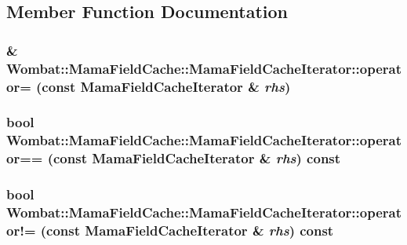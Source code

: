 \subsection{Member Function Documentation}
\hypertarget{classWombat_1_1MamaFieldCache_1_1MamaFieldCacheIterator_adf1ab9b28b21e86297a0e201803f4d89}{
\subsubsection[{operator=}]{\& Wombat::MamaFieldCache::MamaFieldCacheIterator::operator= (const {\bf MamaFieldCacheIterator} \& {\em rhs})}}
\label{classWombat_1_1MamaFieldCache_1_1MamaFieldCacheIterator_adf1ab9b28b21e86297a0e201803f4d89}
\hypertarget{classWombat_1_1MamaFieldCache_1_1MamaFieldCacheIterator_a46582789b82491eb9617713785bf5b38}{
\subsubsection[{operator==}]{\setlength{\rightskip}{0pt plus 5cm}bool Wombat::MamaFieldCache::MamaFieldCacheIterator::operator== (const {\bf MamaFieldCacheIterator} \& {\em rhs}) const}}
\label{classWombat_1_1MamaFieldCache_1_1MamaFieldCacheIterator_a46582789b82491eb9617713785bf5b38}
\hypertarget{classWombat_1_1MamaFieldCache_1_1MamaFieldCacheIterator_abf51da7ad8a7cb2dddf8218c0c277c4b}{
\subsubsection[{operator!=}]{\setlength{\rightskip}{0pt plus 5cm}bool Wombat::MamaFieldCache::MamaFieldCacheIterator::operator!= (const {\bf MamaFieldCacheIterator} \& {\em rhs}) const}}
\label{classWombat_1_1MamaFieldCache_1_1MamaFieldCacheIterator_abf51da7ad8a7cb2dddf8218c0c277c4b}
